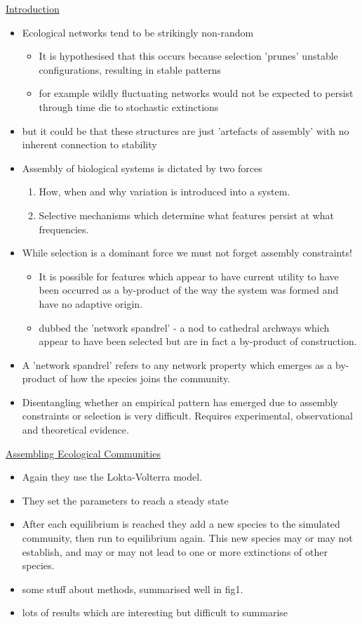 \underline{Introduction}
\begin{itemize}
	\item Ecological networks tend to be strikingly non-random
	\begin{itemize}
		\item It is hypothesised that this occurs because selection 'prunes' unstable configurations, resulting in stable patterns
		\item for example wildly fluctuating networks would not be expected to persist through time die to stochastic extinctions
	\end{itemize}
	\item but it could be that these structures are just 'artefacts of assembly' with no inherent connection to stability
	\item Assembly of biological systems is dictated by two forces
	\begin{enumerate}
		\item How, when and why variation is introduced into a system.
		\item Selective mechanisms which determine what features persist at what frequencies. 
	\end{enumerate}
	\item While selection is a dominant force we must not forget assembly constraints!
	\begin{itemize}
		\item It is possible for features which appear to have current utility to have been occurred as a by-product of the way the system was formed and have no adaptive origin.
		\item dubbed the 'network spandrel' - a nod to cathedral archways which appear to have been selected but are in fact a by-product of construction.
	\end{itemize}
	\item A 'network spandrel' refers to any network property which emerges as a by-product of how the species joins the community.
	\item Disentangling whether an empirical pattern has emerged due to assembly constraints or selection is very difficult. Requires experimental, observational and theoretical evidence.
\end{itemize}

\underline{Assembling Ecological Communities}
\begin{itemize}
	\item Again they use the Lokta-Volterra model.
	\item They set the parameters to reach a steady state
	\item After each equilibrium is reached they add a new species to the simulated community, then run to equilibrium again. This new species may or may not establish, and may or may not lead to one or more extinctions of other species.
	\item some stuff about methods, summarised well in fig1.
	\item lots of results which are interesting but difficult to summarise
\end{itemize}

